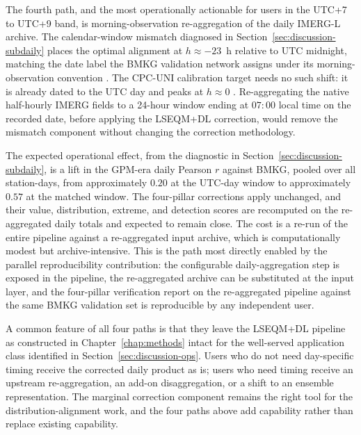 The fourth path, and the most operationally actionable for users
in the UTC+7 to UTC+9 band, is morning-observation re-aggregation
of the daily IMERG-L archive. The calendar-window mismatch
diagnosed in Section~\ref{sec:discussion-subdaily} places the
optimal alignment at $h \approx -23$~h relative to UTC midnight,
matching the date label the BMKG validation network assigns under
its morning-observation convention \citep{ref:bmkg2006sk32}. The
CPC-UNI calibration target needs no such shift: it is already
dated to the UTC day and peaks at $h \approx 0$
\citep{ref:cpcuni_readme}. Re-aggregating the native half-hourly
IMERG fields \citep{ref:imerghhl07} to a 24-hour window ending at
$07{:}00$ local time on the recorded date, before applying the
LSEQM+DL correction, would remove the mismatch component without
changing the correction methodology.

The expected operational
effect, from the diagnostic in
Section~\ref{sec:discussion-subdaily}, is a lift in the GPM-era
daily Pearson $r$ against BMKG, pooled over all station-days, from
approximately $0.20$ at the
UTC-day window to approximately $0.57$ at the matched window. The
four-pillar corrections apply unchanged, and their value,
distribution, extreme, and detection scores are recomputed on the
re-aggregated daily totals and expected to remain close. The cost is a re-run
of the entire pipeline against a re-aggregated input archive,
which is computationally modest but archive-intensive. This is
the path most directly enabled by the parallel reproducibility
contribution: the configurable daily-aggregation step is exposed
in the pipeline, the re-aggregated archive can be substituted at
the input layer, and the four-pillar verification report on the
re-aggregated pipeline against the same BMKG validation set is
reproducible by any independent user.

A common feature of all four paths is that they leave the
LSEQM+DL pipeline as constructed in Chapter~\ref{chap:methods}
intact for the well-served application class identified in
Section~\ref{sec:discussion-ops}. Users who do not need
day-specific timing receive the corrected daily product as is;
users who need timing receive an upstream re-aggregation, an
add-on disaggregation, or a shift to an ensemble representation.
The marginal correction component remains the right tool for the
distribution-alignment work, and the four paths above add
capability rather than replace existing capability.


